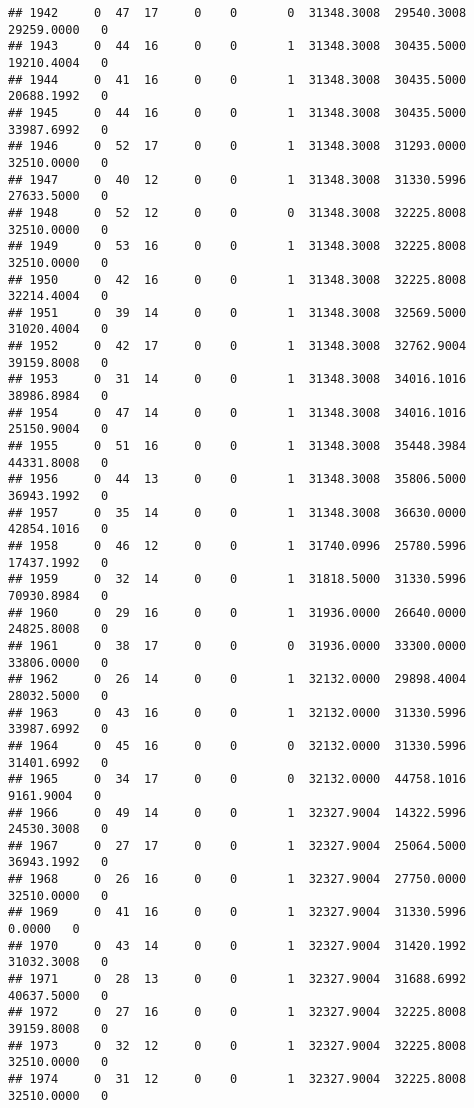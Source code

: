 \documentclass[
]{article}
\begin{document}
\begin{enumerate}
\begin{verbatim}
## 1942     0  47  17     0    0       0  31348.3008  29540.3008  29259.0000   0
## 1943     0  44  16     0    0       1  31348.3008  30435.5000  19210.4004   0
## 1944     0  41  16     0    0       1  31348.3008  30435.5000  20688.1992   0
## 1945     0  44  16     0    0       1  31348.3008  30435.5000  33987.6992   0
## 1946     0  52  17     0    0       1  31348.3008  31293.0000  32510.0000   0
## 1947     0  40  12     0    0       1  31348.3008  31330.5996  27633.5000   0
## 1948     0  52  12     0    0       0  31348.3008  32225.8008  32510.0000   0
## 1949     0  53  16     0    0       1  31348.3008  32225.8008  32510.0000   0
## 1950     0  42  16     0    0       1  31348.3008  32225.8008  32214.4004   0
## 1951     0  39  14     0    0       1  31348.3008  32569.5000  31020.4004   0
## 1952     0  42  17     0    0       1  31348.3008  32762.9004  39159.8008   0
## 1953     0  31  14     0    0       1  31348.3008  34016.1016  38986.8984   0
## 1954     0  47  14     0    0       1  31348.3008  34016.1016  25150.9004   0
## 1955     0  51  16     0    0       1  31348.3008  35448.3984  44331.8008   0
## 1956     0  44  13     0    0       1  31348.3008  35806.5000  36943.1992   0
## 1957     0  35  14     0    0       1  31348.3008  36630.0000  42854.1016   0
## 1958     0  46  12     0    0       1  31740.0996  25780.5996  17437.1992   0
## 1959     0  32  14     0    0       1  31818.5000  31330.5996  70930.8984   0
## 1960     0  29  16     0    0       1  31936.0000  26640.0000  24825.8008   0
## 1961     0  38  17     0    0       0  31936.0000  33300.0000  33806.0000   0
## 1962     0  26  14     0    0       1  32132.0000  29898.4004  28032.5000   0
## 1963     0  43  16     0    0       1  32132.0000  31330.5996  33987.6992   0
## 1964     0  45  16     0    0       0  32132.0000  31330.5996  31401.6992   0
## 1965     0  34  17     0    0       0  32132.0000  44758.1016   9161.9004   0
## 1966     0  49  14     0    0       1  32327.9004  14322.5996  24530.3008   0
## 1967     0  27  17     0    0       1  32327.9004  25064.5000  36943.1992   0
## 1968     0  26  16     0    0       1  32327.9004  27750.0000  32510.0000   0
## 1969     0  41  16     0    0       1  32327.9004  31330.5996      0.0000   0
## 1970     0  43  14     0    0       1  32327.9004  31420.1992  31032.3008   0
## 1971     0  28  13     0    0       1  32327.9004  31688.6992  40637.5000   0
## 1972     0  27  16     0    0       1  32327.9004  32225.8008  39159.8008   0
## 1973     0  32  12     0    0       1  32327.9004  32225.8008  32510.0000   0
## 1974     0  31  12     0    0       1  32327.9004  32225.8008  32510.0000   0

\end{verbatim}
\end{enumerate}
\end{document}
